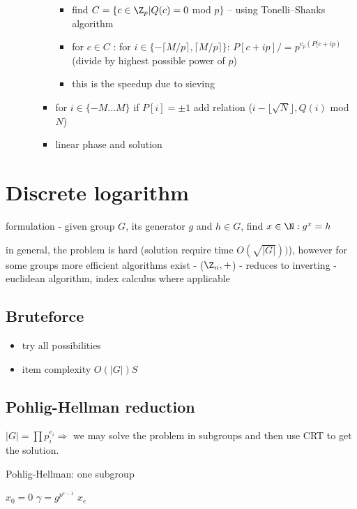 \begin{itemize}
\begin{itemize}
\begin{itemize}
			\begin{itemize}
				\item find $C = \{c\in \Z_p | Q(c) = 0$ mod $p\}$ -- using Tonelli--Shanks algorithm
				\item for $c \in C$ : for $i \in \{-\lceil M/p \rceil,  \lceil M/p \rceil\}$: $P[c+ip] /= p^{v_p(P[c+ip)}$ (divide by highest possible power of $p$)
				\item this is the speedup due to sieving
			\end{itemize}
			\item for $i\in \{-M...M\}$ if $P[i] = \pm 1$ add relation ($i-\lfloor \sqrt{N} \rfloor, Q(i) $ mod $N$)
			\item linear phase and solution
		\end{itemize}
		
	\end{itemize}
	
	
\end{itemize}


\section*{Discrete logarithm}
formulation - given group $G$, its generator $g$ and $h\in G$, find $x\in\N : g^x = h$

in general, the problem is hard (solution require time $O(\sqrt{|G|}))$), however for some groups more efficient algorithms exist - ($\Z_n, +$) - reduces to inverting - euclidean algorithm, index calculus where applicable

\subsection*{Bruteforce}
\begin{itemize}
	\item try all possibilities
	\item item complexity $O(|G|)S$
\end{itemize}

\subsection*{Pohlig-Hellman reduction}
$|G| = \prod p_i^{e_i} \Rightarrow$ we may solve the problem in subgroups and then use CRT to get the solution.

\begin{algorithm}
	\caption{Pohlig-Hellman: one subgroup}
	$x_0=0$\;
	$\gamma = g^{p^{e-1}}$\;
	\Return $x_e$
    \vspace{0.2cm}
\end{algorithm}

